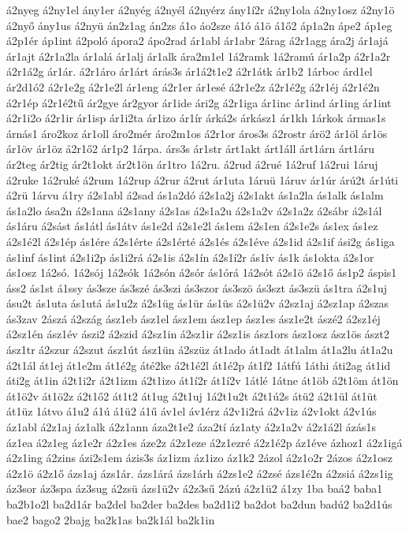 {á2nyeg
á2ny1el
ány1er
á2nyég
á2nyél
á2nyérz
ány1í2r
á2ny1ola
á2ny1osz
á2ny1ö
á2nyő
ány1us
á2nyü
án2z1ag
án2zs
á1o
áo2sze
á1ó
á1ö
á1ő2
áp1a2n
ápe2
áp1eg
á2p1ér
áp1int
á2poló
ápora2
ápo2rad
ár1abl
ár1abr
2árag
á2r1agg
ára2j
ár1ajá
ár1ajt
á2r1a2la
ár1alá
ár1alj
ár1alk
ára2m1el
1á2ramk
1á2ramú
ár1a2p
á2r1a2r
á2r1á2g
ár1ár.
á2r1áro
ár1árt
árás3s
ár1á2t1e2
á2r1átk
ár1b2
1árboc
árd1el
ár2d1ó2
á2r1e2g
á2r1e2l
ár1eng
á2r1er
ár1esé
á2r1e2z
á2r1é2g
á2r1éj
á2r1é2n
á2r1ép
á2r1é2tű
ár2gye
ár2gyor
ár1ide
ári2g
á2r1iga
ár1inc
ár1ind
ár1ing
ár1int
á2r1i2o
á2r1ir
ár1isp
ár1i2ta
ár1izo
ár1ír
árká2s
árkász1
ár1kh
1árkok
ármas1s
árnás1
áro2koz
ár1oll
áro2mér
áro2m1os
á2r1or
áros3s
á2rostr
árö2
ár1öl
ár1ös
ár1öv
ár1öz
á2r1ő2
ár1p2
1árpa.
árs3s
ár1str
árt1akt
árt1áll
árt1árn
árt1áru
ár2teg
ár2tig
ár2t1okt
ár2t1ön
ár1tro
1á2ru.
á2rud
á2rué
1á2ruf
1á2rui
1áruj
á2ruke
1á2ruké
á2rum
1á2rup
á2rur
á2rut
ár1uta
1áruü
1áruv
ár1úr
árú2t
ár1úti
á2rü
1árvu
á1ry
á2s1abl
á2sad
ás1a2dó
á2s1a2j
á2s1akt
ás1a2la
ás1alk
ás1alm
ás1a2lo
ása2n
á2s1ana
á2s1any
á2s1as
á2s1a2u
á2s1a2v
á2s1a2z
á2sábr
á2s1ál
ás1áru
á2sást
ás1átl
ás1átv
ás1e2d
á2s1e2l
ás1em
á2s1en
á2s1e2s
ás1ex
ás1ez
á2s1é2l
á2s1ép
ás1ére
á2s1érte
á2s1érté
á2s1és
á2s1éve
á2s1id
á2s1if
ási2g
ás1iga
ás1inf
ás1int
á2s1i2p
ás1i2rá
á2s1is
á2s1ín
á2s1í2r
ás1ív
ás1k
ás1okta
á2s1or
ás1osz
1á2só.
1á2sój
1á2sók
1á2són
á2sór
ás1órá
1á2sót
á2s1ö
á2s1ő
ás1p2
áspis1
áss2
ás1st
á1ssy
ás3sze
ás3szé
ás3szi
ás3szor
ás3szö
ás3szt
ás3szü
ás1tra
á2s1uj
ásu2t
ás1uta
ás1utá
ás1u2z
á2s1üg
ás1ür
ás1üs
á2s1ü2v
á2sz1aj
á2sz1ap
á2szas
ás3zav
2ászá
á2szág
ász1eb
ász1el
ász1em
ász1ep
ász1es
ász1e2t
ászé2
á2sz1éj
á2sz1én
ász1év
ászi2
á2szid
á2sz1in
á2sz1ir
á2sz1is
ász1ors
ász1osz
ász1ös
ászt2
ász1tr
á2szur
á2szut
ász1út
ász1ün
á2szüz
át1ado
át1adt
át1alm
át1a2lu
át1a2u
á2t1ál
át1ej
át1e2m
át1é2g
áté2ke
á2t1é2l
át1é2p
át1f2
1átfú
1áthi
áti2ag
át1id
áti2g
át1in
á2t1i2r
á2t1izm
á2t1izo
át1í2r
át1í2v
1átlé
1átne
át1öb
á2t1öm
át1ön
át1ö2v
át1ö2z
á2t1ő2
át1t2
át1ug
á2t1uj
1á2t1u2t
á2t1ú2s
átü2
á2t1ül
át1üt
át1üz
1átvo
á1u2
á1ú
á1ü2
á1ű
áv1el
áv1érz
á2v1i2rá
á2v1iz
á2v1okt
á2v1ús
áz1abl
á2z1aj
áz1alk
á2z1ann
áza2t1e2
áza2tí
áz1aty
á2z1a2v
á2z1á2l
ázás1s
áz1ea
á2z1eg
áz1e2r
á2z1es
áze2z
á2z1eze
á2z1ezré
á2z1é2p
áz1éve
ázhoz1
á2z1igá
á2z1ing
á2zins
ázi2s1em
ázis3s
áz1izm
áz1izo
áz1k2
2ázol
á2z1o2r
2ázos
á2z1osz
á2z1ö
á2z1ő
ázs1aj
ázs1ár.
ázs1árá
ázs1árh
á2zs1e2
á2zsé
ázs1é2n
á2zsiá
á2zs1ig
áz3sor
áz3spa
áz3sug
á2zsü
ázs1ü2v
á2z3sű
2ázú
á2z1ü2
á1zy
1ba
baá2
baba1
ba2b1o2l
ba2d1ár
ba2del
ba2der
ba2des
ba2d1i2
ba2dot
ba2dun
badú2
ba2d1ús
bae2
bago2
2bajg
ba2k1as
ba2k1ál
ba2k1in
}
